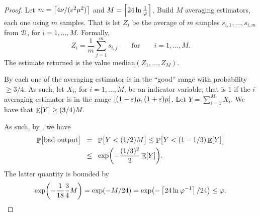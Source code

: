 \begin{proof}
    Let $m = \bigl\lceil{ {4 \nu}/({\varepsilon}^2\mu^2) } \bigr\rceil$ and
    $M = \left\lceil {24 \ln \frac{1}{\varphi}} \right\rceil$. Build $M$ averaging
    estimators, each one using $m$ samples.  That is let $Z_i$ be the
    average of $m$ samples $s_{i,1}, \ldots, s_{i, m}$ from
    $\EuScript{D}$, for $i=1, \ldots, M$. Formally,
    \begin{equation*}
        Z_i = \frac{1}{m} \sum_{j=1}^m s_{i,j}
        \qquad
        \text{for}\qquad i=1,\ldots, M.
    \end{equation*}
    The estimate returned is the value
    $\mathrm{median}( Z_1, \ldots, Z_{M} )$.

    By  each one of the averaging
    estimator is in the ``good'' range with probability $\geq 3/4$. As
    such, let $X_i$, for $i=1,\ldots, M$, be an indicator variable,
    that is $1$ if the $i$\th averaging estimator is in the range
    $[(1-{\varepsilon})\mu,(1+{\varepsilon})\mu]$. Let $Y = \sum_{i=1}^{M}X_i$. We have
    that
    \begin{math}
        \mathop{\mathbb{E}}\!\left[ {Y} \right] \geq (3/4)M.
    \end{math}

      As
    such, by , we have
    \begin{align*}
        \Prob{\bigl. \text{bad output}}
        &\EQ%
        \Prob{\bigl.Y < (1/2)M}
        \leq
        \Prob{\bigl.Y < (1-1/3) \Ex{Y}}
        \\
        &\LEQ
        \exp\pth{ - \frac{(1/3)^2}{2}\Ex{Y}}.
    \end{align*}
    The latter quantity is bounded by
    \begin{equation*}
        \exp\pth{ - \frac{1}{18} \frac{3}{4} M} = \exp( -M/24)=
        \exp\pth{ - \ceil{24 \ln \BadProb^{-1}} /24 } \leq%
        \BadProb.
    \end{equation*}
\end{proof}




